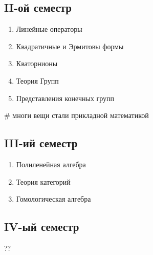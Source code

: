 \documentclass{book}
\begin{document}
\subsection{II-ой семестр}
\begin{enumerate}
    \item Линейные операторы
    \item Квадратичные и Эрмитовы формы
    \item Кваторнионы
    \item Теория Групп
    \item Представления конечных групп
\end{enumerate}
\# многи вещи стали прикладной математикой
\subsection{III-ий семестр}
\begin{enumerate}
    \item Полиленейная алгебра
    \item Теория категорий
    \item Гомологическая алгебра
\end{enumerate}
\subsection{IV-ый семестр}
??


\end{document}
